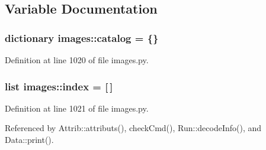 \subsection{Variable Documentation}
\hypertarget{namespaceimages_ab6e2df196c0462d557cd3bb46ddf7166}{
\subsubsection[{catalog}]{\setlength{\rightskip}{0pt plus 5cm}dictionary {\bf images::catalog} = \{\}}}
\label{namespaceimages_ab6e2df196c0462d557cd3bb46ddf7166}


Definition at line 1020 of file images.py.\hypertarget{namespaceimages_a1e4ca93eea3db045fe09f3cb4622c507}{
\subsubsection[{index}]{\setlength{\rightskip}{0pt plus 5cm}list {\bf images::index} = \mbox{[}$\,$\mbox{]}}}
\label{namespaceimages_a1e4ca93eea3db045fe09f3cb4622c507}


Definition at line 1021 of file images.py.

Referenced by Attrib::attributs(), checkCmd(), Run::decodeInfo(), and Data::print().
